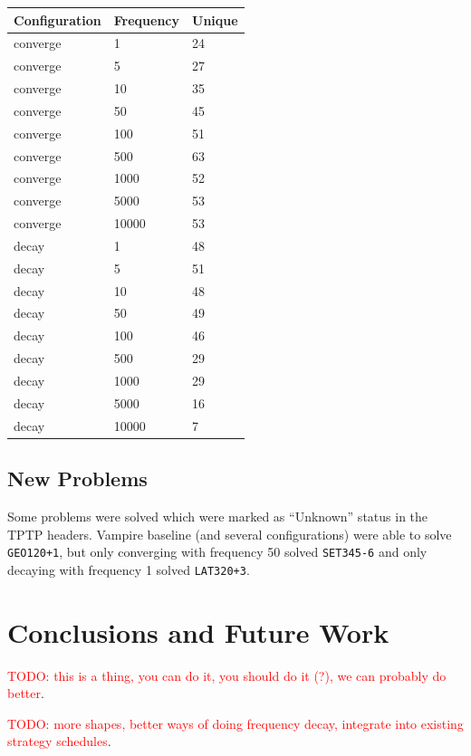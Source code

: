 \documentclass{llncs}
\newcommand{\todo}[1]{\textcolor{red}{TODO: #1}}
\begin{document}
\begin{center}
\begin{tabular}{l l l}
	Configuration & Frequency & Unique\\
	\hline
	converge & 1 & 24\\
	converge & 5 & 27\\
	converge & 10 & 35\\
	converge & 50 & 45\\
	converge & 100 & 51\\
	converge & 500 & 63\\
	converge & 1000 & 52\\
	converge & 5000 & 53\\
	converge & 10000 & 53\\
	\hline
	decay & 1 & 48\\
	decay & 5 & 51\\
	decay & 10 & 48\\
	decay & 50 & 49\\
	decay & 100 & 46\\
	decay & 500 & 29\\
	decay & 1000 & 29\\
	decay & 5000 & 16\\
	decay & 10000 & 7\\
\end{tabular}
\end{center}

\subsection{New Problems}
Some problems were solved which were marked as ``Unknown'' status in the TPTP headers.
Vampire baseline (and several configurations) were able to solve \texttt{GEO120+1}, but only converging with frequency 50 solved \texttt{SET345-6} and only decaying with frequency 1 solved \texttt{LAT320+3}.


\section{Conclusions and Future Work}
\label{sec:conclusions}

\todo{this is a thing, you can do it, you should do it (?), we can probably do better}.

\todo{more shapes, better ways of doing frequency decay, integrate into existing strategy schedules}.



\end{document}
